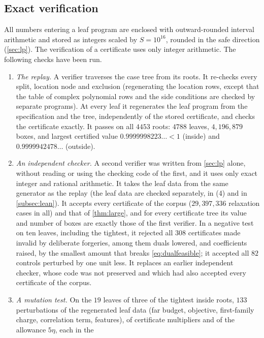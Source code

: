 \documentclass[11pt]{amsart}
\numberwithin{equation}{section}
\theoremstyle{plain}
\theoremstyle{definition}
\theoremstyle{remark}
\newcommand{\1}{\mathbf{1}}
\begin{document}
\subsection{Exact verification}
All numbers entering a leaf program are enclosed with outward-rounded interval arithmetic and
stored as integers scaled by $S=10^{16}$, rounded in the safe direction (\cref{sec:lp}). The
verification of a certificate uses only integer arithmetic. The following checks have been run.
\begin{enumerate}[(1)]
  \item \emph{The replay.} A verifier traverses the case tree from its roots. It re-checks every
    split, location node and exclusion (regenerating the location rows, except that the table
    of complex polynomial rows and the side conditions \cite[(4.29), (4.34)]{Xylouris2011nullstellen} are
    checked by separate programs).
    At every leaf it regenerates the leaf program from the specification and the tree,
    independently of the stored certificate, and checks the certificate exactly. It passes on all
    $4453$ roots: $4788$ leaves, $4{,}196{,}879$ boxes, and largest certified value
    $0.9999998223\ldots<1$ (inside) and $0.9999942478\ldots$ (outside).
  \item \emph{An independent checker.} A second verifier was written from \cref{sec:lp} alone,
    without reading or using the checking code of the first, and it uses only exact integer and
    rational arithmetic. It takes the leaf data from the same generator as the replay (the leaf
    data are checked separately, in (4) and in \cref{subsec:lean}). It accepts every certificate of
    the corpus ($29{,}397{,}336$ relaxation cases in all) and that of \cref{thm:large}, and for every
    certificate tree its value and number of boxes are exactly those of the first verifier. In a
    negative test on ten leaves, including the tightest, it rejected all $308$ certificates made
    invalid by deliberate forgeries, among them duals lowered, and coefficients raised, by the
    smallest amount that breaks \eqref{eq:dualfeasible}; it accepted all $82$ controls perturbed by
    one unit less. It replaces an earlier independent checker, whose code was not preserved and
    which had also accepted every certificate of the corpus.
  \item \emph{A mutation test.} On the $19$ leaves of three of the tightest inside roots, $133$
    perturbations of the regenerated leaf data (far budget, objective, first-family charge,
    correlation term, features), of certificate multipliers and of the allowance $5\eta$, each in the

\end{enumerate}
\end{document}
